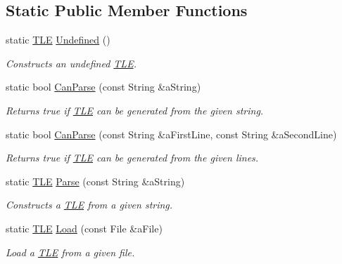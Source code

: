 \subsection*{Static Public Member Functions}
\begin{DoxyCompactItemize}
\item 
static \hyperlink{classlibrary_1_1astro_1_1trajectory_1_1orbit_1_1models_1_1sgp4_1_1_t_l_e}{T\+LE} \hyperlink{classlibrary_1_1astro_1_1trajectory_1_1orbit_1_1models_1_1sgp4_1_1_t_l_e_ac251783ddaeffea2f48f9cf0bf9aaf5e}{Undefined} ()
\begin{DoxyCompactList}\small\item\em Constructs an undefined \hyperlink{classlibrary_1_1astro_1_1trajectory_1_1orbit_1_1models_1_1sgp4_1_1_t_l_e}{T\+LE}. \end{DoxyCompactList}\item 
static bool \hyperlink{classlibrary_1_1astro_1_1trajectory_1_1orbit_1_1models_1_1sgp4_1_1_t_l_e_a25d768ff21d590d34cd20d4101e07840}{Can\+Parse} (const String \&a\+String)
\begin{DoxyCompactList}\small\item\em Returns true if \hyperlink{classlibrary_1_1astro_1_1trajectory_1_1orbit_1_1models_1_1sgp4_1_1_t_l_e}{T\+LE} can be generated from the given string. \end{DoxyCompactList}\item 
static bool \hyperlink{classlibrary_1_1astro_1_1trajectory_1_1orbit_1_1models_1_1sgp4_1_1_t_l_e_a402cf951360912e70b167bc335c4f9a3}{Can\+Parse} (const String \&a\+First\+Line, const String \&a\+Second\+Line)
\begin{DoxyCompactList}\small\item\em Returns true if \hyperlink{classlibrary_1_1astro_1_1trajectory_1_1orbit_1_1models_1_1sgp4_1_1_t_l_e}{T\+LE} can be generated from the given lines. \end{DoxyCompactList}\item 
static \hyperlink{classlibrary_1_1astro_1_1trajectory_1_1orbit_1_1models_1_1sgp4_1_1_t_l_e}{T\+LE} \hyperlink{classlibrary_1_1astro_1_1trajectory_1_1orbit_1_1models_1_1sgp4_1_1_t_l_e_a842dce63b9adc35c1cb0e21d1777b3a5}{Parse} (const String \&a\+String)
\begin{DoxyCompactList}\small\item\em Constructs a \hyperlink{classlibrary_1_1astro_1_1trajectory_1_1orbit_1_1models_1_1sgp4_1_1_t_l_e}{T\+LE} from a given string. \end{DoxyCompactList}\item 
static \hyperlink{classlibrary_1_1astro_1_1trajectory_1_1orbit_1_1models_1_1sgp4_1_1_t_l_e}{T\+LE} \hyperlink{classlibrary_1_1astro_1_1trajectory_1_1orbit_1_1models_1_1sgp4_1_1_t_l_e_a573d75ef5c2b7ed157dce83fdb556d44}{Load} (const File \&a\+File)
\begin{DoxyCompactList}\small\item\em Load a \hyperlink{classlibrary_1_1astro_1_1trajectory_1_1orbit_1_1models_1_1sgp4_1_1_t_l_e}{T\+LE} from a given file. \end{DoxyCompactList}\end{DoxyCompactItemize}
